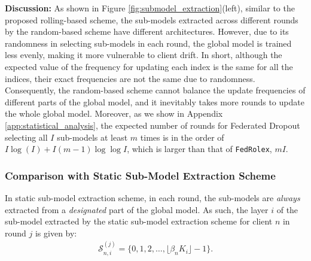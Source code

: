 \documentclass{article}
\begin{document}
\textbf{Discussion:} 
As shown in Figure \ref{fig:submodel_extraction}(left), similar to the proposed rolling-based scheme, the sub-models extracted across different rounds by the random-based scheme have different architectures.
%
However, due to its randomness in selecting sub-models in each round, the global model is trained less evenly, making it more vulnerable to client drift.
%
%
In short, although the expected value of the frequency for updating each index is the same for all the indices, their exact frequencies are not the same due to randomness. 
Consequently, the random-based scheme cannot balance the update frequencies of different parts of the global model, and it inevitably takes more rounds to update the whole global model.
%
Moreover, as we show in Appendix \ref{app:statistical_analysis}, the expected number of rounds for Federated Dropout   selecting all $I$ sub-models at least $m$  times is in the order of $I\log(I)+I(m-1)\log\log I$, which is larger than that of \texttt{FedRolex}, $mI$. 


\subsubsection{Comparison with Static Sub-Model Extraction Scheme}\label{sec:comparison}
%
In static sub-model extraction scheme, in each round, the sub-models are \textit{always} extracted from a \textit{designated} part of the global model.
%
As such, the layer $i$ of the sub-model extracted by the static sub-model extraction scheme for client $n$ in round $j$ is given by:
%
\begin{align}
    \mathcal{S}^{(j)}_{n,i} = \{0,1,2,\dots, \lfloor \beta_n K_i\rfloor-1\}.
\end{align}
\vspace{-5mm}
\end{document}
